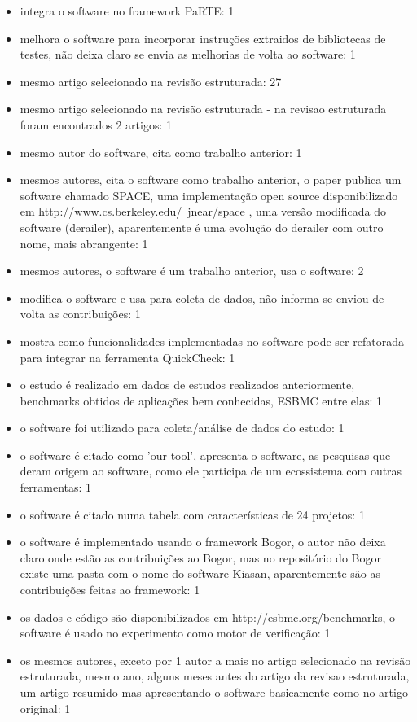 \begin{itemize}
\item integra o software no framework PaRTE: 1
\item melhora o software para incorporar instruções extraidos de bibliotecas de testes, não deixa claro se envia as melhorias de volta ao software: 1
\item mesmo artigo selecionado na revisão estruturada: 27
\item mesmo artigo selecionado na revisão estruturada - na revisao estruturada foram encontrados 2 artigos: 1
\item mesmo autor do software, cita como trabalho anterior: 1
\item mesmos autores, cita o software como trabalho anterior, o paper publica um software chamado SPACE, uma implementação open source disponibilizado em http://www.cs.berkeley.edu/~jnear/space , uma versão modificada do software (derailer), aparentemente é uma evolução do derailer com outro nome, mais abrangente: 1
\item mesmos autores, o software é um trabalho anterior, usa o software: 2
\item modifica o software e usa para coleta de dados, não informa se enviou de volta as contribuições: 1
\item mostra como funcionalidades implementadas no software pode ser refatorada para integrar na ferramenta QuickCheck: 1
\item o estudo é realizado em dados de estudos realizados anteriormente, benchmarks obtidos de aplicações bem conhecidas, ESBMC entre elas: 1
\item o software foi utilizado para coleta/análise de dados do estudo: 1
\item o software é citado como 'our tool', apresenta o software, as pesquisas que deram origem ao software, como ele participa de um ecossistema com outras ferramentas: 1
\item o software é citado numa tabela com características de 24 projetos: 1
\item o software é implementado usando o framework Bogor, o autor não deixa claro onde estão as contribuições ao Bogor, mas no repositório do Bogor existe uma pasta com o nome do software Kiasan, aparentemente são as contribuições feitas ao framework: 1
\item os dados e código são disponibilizados em http://esbmc.org/benchmarks, o software é usado no experimento como motor de verificação: 1
\item os mesmos autores, exceto por 1 autor a mais no artigo selecionado na revisão estruturada, mesmo ano, alguns meses antes do artigo da revisao estruturada, um artigo resumido mas apresentando o software basicamente como no artigo original: 1

\end{itemize}
